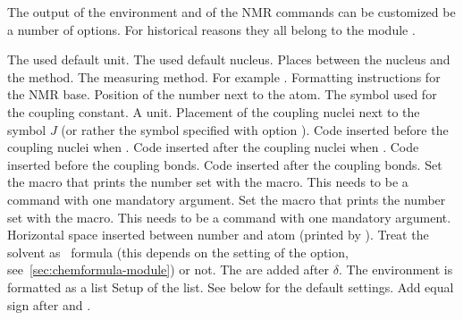 \documentclass{chemmacros-manual}
\begin{document}
The output of the environment and of the NMR commands can be customized be a
number of options.  For historical reasons they all belong to the module
.
\begin{options}
    The used default unit.
    The used default nucleus.
  \Default{-}
    Places  between the nucleus and the method.
    The measuring method.
  \Default
    For example .
  \Default
    Formatting instructions for the NMR base.
    Position of the number next to the atom.
    The symbol used for the coupling constant.
    A  unit.
    Placement of the coupling nuclei next to the symbol $J$ (or rather the
    symbol specified with option ).
  \Default{(}
    Code inserted before the coupling nuclei when .
  \Default{)}
    Code inserted after the coupling nuclei when .
  \Default
    Code inserted before the coupling bonds.
  \Default{\cs*{!}}
    Code inserted after the coupling bonds.
    Set the macro that prints the number set with the  macro.  This
    needs to be a command with one mandatory argument.
    Set the macro that prints the number set with the \cs{\#} macro.  This
    needs to be a command with one mandatory argument.
  \Default{.16667em}
    Horizontal space inserted between number and atom
    (printed by \cs{\#}).
    Treat the solvent as \chemformula\ formula (this depends on the setting of
    the  option, see~\vref{sec:chemformula-module}) or not.
  \Default
    The  are added after $\delta$.
    The environment  is formatted as a list
    Setup of the list. See below for the default settings.
    Add equal sign after  and .
\end{options}
\end{document}
